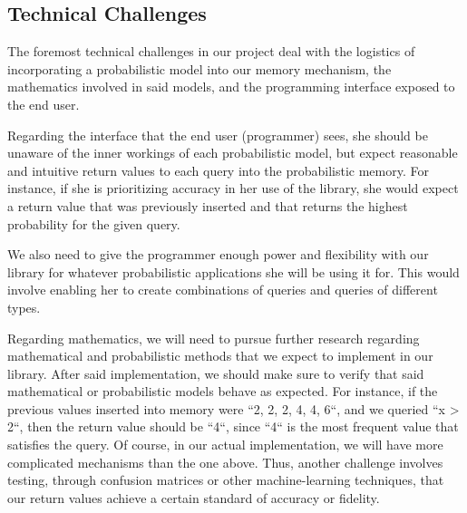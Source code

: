 \documentclass{sig-alternate}
\begin{document}
%

\subsection{Technical Challenges}
\label{subsec:tech_challenges}
The foremost technical challenges in our project deal with the logistics of incorporating
a probabilistic model into our memory mechanism, the mathematics involved in said models,
and the programming interface exposed to the end user.

Regarding the interface that the end user (programmer) sees, she should be unaware of 
the inner workings of each probabilistic model, but expect reasonable and intuitive return values
to each query into the probabilistic memory. For instance, if she is prioritizing accuracy 
in her use of the library, she would expect a return value that was previously inserted and that 
returns the highest probability for the given query.

We also need to give the programmer enough power and flexibility with our library for 
whatever probabilistic applications she will be using it for. This would involve enabling 
her to create combinations of queries and queries of different types.

Regarding mathematics, we will need to pursue further research regarding mathematical 
and probabilistic methods that we expect to implement in our library. After said implementation,
we should make sure to verify that said mathematical or probabilistic models behave as expected. 
For instance, if the previous values inserted into memory were ``2, 2, 2, 4, 4, 6``, and we queried ``x > 2``, 
then the return value should be ``4``, since ``4`` is the most frequent value that satisfies the query.
Of course, in our actual implementation, we will have more complicated mechanisms than the one above.
Thus, another challenge involves testing, through confusion matrices or other machine-learning techniques,
that our return values achieve a certain standard of accuracy or fidelity.
\end{document}
